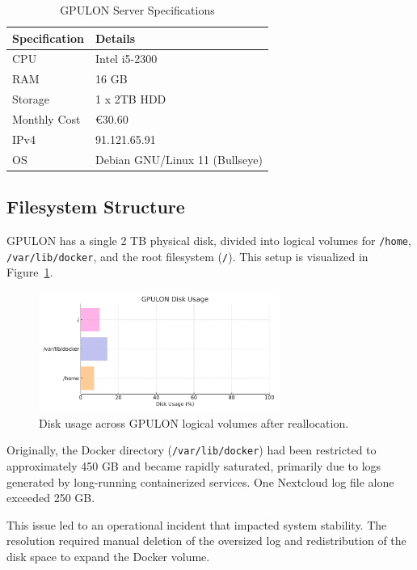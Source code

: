 \begin{table}[H]
  \centering
  \caption{GPULON Server Specifications}
  \label{tab:gpulon_specs}
  \begin{tabular}{ll}
    \rowcolor{udcpink!25}
    \textbf{Specification} & \textbf{Details} \\
    \hline
    CPU & Intel i5-2300 \\
    RAM & 16 GB \\
    Storage & 1 x 2TB HDD \\
    Monthly Cost & €30.60 \\
    IPv4 & 91.121.65.91 \\
    OS & Debian GNU/Linux 11 (Bullseye) \\
  \end{tabular}
\end{table}

\subsection{Filesystem Structure}

GPULON has a single 2 TB physical disk, divided into logical volumes for \texttt{/home}, \texttt{/var/lib/docker}, and the root filesystem (\texttt{/}). This setup is visualized in Figure~\ref{fig:gpulon_disk_usage}.

\begin{figure}[H]
  \centering
  \includegraphics[width=0.7\textwidth]{figuras/gpulon_disk_usage.pdf}
  \caption{Disk usage across GPULON logical volumes after reallocation.}
  \label{fig:gpulon_disk_usage}
\end{figure}

Originally, the Docker directory (\texttt{/var/lib/docker}) had been restricted to approximately 450 GB and became rapidly saturated, primarily due to logs generated by long-running containerized services. One Nextcloud log file alone exceeded 250 GB.

This issue led to an operational incident that impacted system stability. The resolution required manual deletion of the oversized log and redistribution of the disk space to expand the Docker volume.

